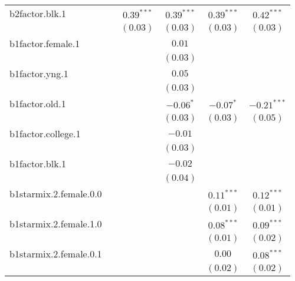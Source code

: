 \begin{table}
\begin{center}
\begin{tabular}{l c c c c c}
b2factor.blk.1         &               & $0.39^{***}$  & $0.39^{***}$  & $0.39^{***}$  & $0.42^{***}$  \\
                       &               & $(0.03)$      & $(0.03)$      & $(0.03)$      & $(0.03)$      \\
b1factor.female.1      &               &               & $0.01$        &               &               \\
                       &               &               & $(0.03)$      &               &               \\
b1factor.yng.1         &               &               & $0.05$        &               &               \\
                       &               &               & $(0.03)$      &               &               \\
b1factor.old.1         &               &               & $-0.06^{*}$   & $-0.07^{*}$   & $-0.21^{***}$ \\
                       &               &               & $(0.03)$      & $(0.03)$      & $(0.05)$      \\
b1factor.college.1     &               &               & $-0.01$       &               &               \\
                       &               &               & $(0.03)$      &               &               \\
b1factor.blk.1         &               &               & $-0.02$       &               &               \\
                       &               &               & $(0.04)$      &               &               \\
b1starmix.2.female.0.0 &               &               &               & $0.11^{***}$  & $0.12^{***}$  \\
                       &               &               &               & $(0.01)$      & $(0.01)$      \\
b1starmix.2.female.1.0 &               &               &               & $0.08^{***}$  & $0.09^{***}$  \\
                       &               &               &               & $(0.01)$      & $(0.02)$      \\
b1starmix.2.female.0.1 &               &               &               & $0.00$        & $0.08^{***}$  \\
                       &               &               &               & $(0.02)$      & $(0.02)$      \\

\end{tabular}
\end{center}
\end{table}
